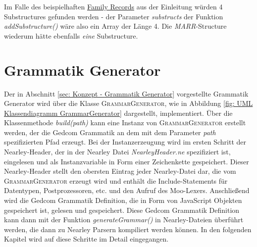 \vspace{1em}

Im Falle des beispielhaften \hyperref[lst: family record example]{Family Records} aus der Einleitung würden 4 Substructures gefunden werden - der Parameter \textit{substructs} der Funktion \textit{addSubstructure()} wäre also ein Array der Länge 4. Die \textit{MARR}-Structure wiederum hätte ebenfalls \textit{eine} Substructure. 

\section{Grammatik Generator}
\label{sec: Implementierung - Grammatik Generator}
Der in Abschnitt \ref{sec: Konzept - Grammatik Generator} vorgestellte Grammatik Generator wird über die Klasse \textsc{GrammarGenerator}, wie in Abbildung \ref{fig: UML Klassendiagramm GrammarGenerator} dargestellt, implementiert. Über die Klassenmethode \textit{build(path)} kann eine Instanz von \textsc{GrammarGenerator} erstellt werden, der die Gedcom Grammatik an dem mit dem Parameter \textit{path} spezifizierten Pfad erzeugt. Bei der Instanzerzeugung wird im ersten Schritt der Nearley-Header, der in der Nearley Datei \textit{NearleyHeader.ne} spezifiziert ist, eingelesen und als Instanzvariable in Form einer Zeichenkette gespeichert. Dieser Nearley-Header stellt den obersten Eintrag jeder Nearley-Datei dar, die vom \textsc{GrammarGenerator} erzeugt wird und enthält die Include-Statements für Datentypen, Postprozessoren, etc. und den Aufruf des Moo-Lexers. Anschließend wird die Gedcom Grammatik Definition, die in Form von JavaScript Objekten gespeichert ist, gelesen und gespeichert. Diese Gedcom Grammatik Definition kann dann mit der Funktion \textit{generateGrammar()} in Nearley-Dateien überführt werden, die dann zu Nearley Parsern kompiliert werden können. In den folgenden Kapitel wird auf diese Schritte im Detail eingegangen.
